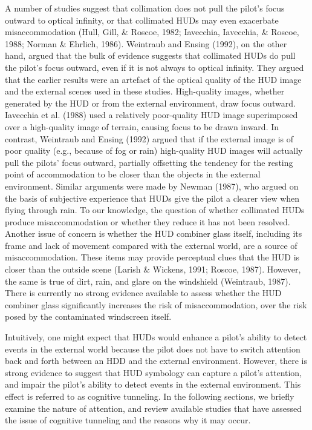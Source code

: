 \documentclass[utf8,bachelor,manualbib]{gradu3}
\begin{document}
A number of studies suggest that collimation does not pull the pilot’s focus outward
to optical infinity, or that collimated HUDs may even exacerbate
misaccommodation (Hull, Gill, \& Roscoe, 1982; Iavecchia, Iavecchia, \& Roscoe,
1988; Norman \& Ehrlich, 1986). Weintraub and Ensing (1992), on the other hand,
argued that the bulk of evidence suggests that collimated HUDs do pull the pilot’s
focus outward, even if it is not always to optical infinity. They argued that the earlier
results were an artefact of the optical quality of the HUD image and the external
scenes used in these studies. High-quality images, whether generated by the
HUD or from the external environment, draw focus outward. Iavecchia et al.
(1988) used a relatively poor-quality HUD image superimposed over a
high-quality image of terrain, causing focus to be drawn inward. In contrast,
Weintraub and Ensing (1992) argued that if the external image is of poor quality
(e.g., because of fog or rain) high-quality HUD images will actually pull the pilots’
focus outward, partially offsetting the tendency for the resting point of accommodation
to be closer than the objects in the external environment. Similar arguments
were made by Newman (1987), who argued on the basis of subjective experience
that HUDs give the pilot a clearer view when flying through rain. To our knowledge,
the question of whether collimated HUDs produce misaccommodation or
whether they reduce it has not been resolved.
Another issue of concern is whether the HUD combiner glass itself, including
its frame and lack of movement compared with the external world, are a source of
misaccommodation. These items may provide perceptual clues that the HUD is
closer than the outside scene (Larish \& Wickens, 1991; Roscoe, 1987). However,
the same is true of dirt, rain, and glare on the windshield (Weintraub, 1987). There
is currently no strong evidence available to assess whether the HUD combiner
glass significantly increases the risk of misaccommodation, over the risk posed by
the contaminated windscreen itself. \citep{crawford2006}

Intuitively, one might expect that HUDs would enhance a pilot’s ability to detect
events in the external world because the pilot does not have to switch attention
back and forth between an HDD and the external environment. However, there
is strong evidence to suggest that HUD symbology can capture a pilot’s attention,
and impair the pilot’s ability to detect events in the external environment.
This effect is referred to as cognitive tunneling. In the following sections, we
briefly examine the nature of attention, and review available studies that have
assessed the issue of cognitive tunneling and the reasons why it may occur.
\end{document}
